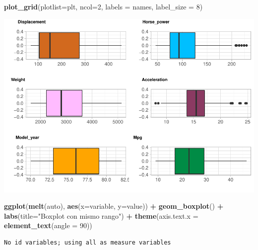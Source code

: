 \documentclass[
]{article}
\newenvironment{Shaded}{\begin{snugshade}}{\end{snugshade}}
\newcommand{\DataTypeTok}[1]{\textcolor[rgb]{0.13,0.29,0.53}{#1}}
\newcommand{\DecValTok}[1]{\textcolor[rgb]{0.00,0.00,0.81}{#1}}
\newcommand{\KeywordTok}[1]{\textcolor[rgb]{0.13,0.29,0.53}{\textbf{#1}}}
\newcommand{\NormalTok}[1]{#1}
\newcommand{\OperatorTok}[1]{\textcolor[rgb]{0.81,0.36,0.00}{\textbf{#1}}}
\newcommand{\StringTok}[1]{\textcolor[rgb]{0.31,0.60,0.02}{#1}}
\begin{document}
\begin{Shaded}
\begin{Highlighting}[]
\KeywordTok{plot_grid}\NormalTok{(}\DataTypeTok{plotlist=}\NormalTok{plt, }\DataTypeTok{ncol=}\DecValTok{2}\NormalTok{, }\DataTypeTok{labels =}\NormalTok{ names, }\DataTypeTok{label_size =} \DecValTok{8}\NormalTok{)}
\end{Highlighting}
\end{Shaded}

\begin{center}\includegraphics{EDA_files/figure-latex/unnamed-chunk-8-7} \end{center}

\begin{Shaded}
\begin{Highlighting}[]
\KeywordTok{ggplot}\NormalTok{(}\KeywordTok{melt}\NormalTok{(auto), }\KeywordTok{aes}\NormalTok{(}\DataTypeTok{x=}\NormalTok{variable, }\DataTypeTok{y=}\NormalTok{value)) }\OperatorTok{+}\StringTok{ }
\StringTok{  }\KeywordTok{geom_boxplot}\NormalTok{() }\OperatorTok{+}
\StringTok{  }\KeywordTok{labs}\NormalTok{(}\DataTypeTok{title=}\StringTok{"Boxplot con mismo rango"}\NormalTok{) }\OperatorTok{+}
\StringTok{  }\KeywordTok{theme}\NormalTok{(}\DataTypeTok{axis.text.x =} \KeywordTok{element_text}\NormalTok{(}\DataTypeTok{angle =} \DecValTok{90}\NormalTok{))}
\end{Highlighting}
\end{Shaded}

\begin{verbatim}
No id variables; using all as measure variables
\end{verbatim}
\end{document}
